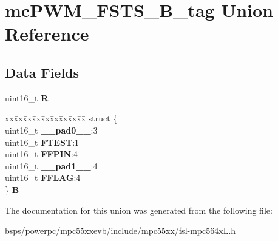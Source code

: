 \hypertarget{unionmcPWM__FSTS__16B__tag}{}\section{mc\+P\+W\+M\+\_\+\+F\+S\+T\+S\+\_\+B\+\_\+tag Union Reference}
\label{unionmcPWM__FSTS__16B__tag}
\subsection*{Data Fields}
\begin{DoxyCompactItemize}
\item 
\mbox{\label{unionmcPWM__FSTS__16B__tag_aafc55c1f2579d0e273c276274f37d31a}} 
uint16\+\_\+t {\bfseries R}
\item 
\mbox{\label{unionmcPWM__FSTS__16B__tag_a7fba2d532d7be63c510093bb674b2115}} 
\begin{tabbing}
xx\=xx\=xx\=xx\=xx\=xx\=xx\=xx\=xx\=\kill
struct \{\\
\>uint16\_t {\bfseries \_\_pad0\_\_}:3\\
\>uint16\_t {\bfseries FTEST}:1\\
\>uint16\_t {\bfseries FFPIN}:4\\
\>uint16\_t {\bfseries \_\_pad1\_\_}:4\\
\>uint16\_t {\bfseries FFLAG}:4\\
\} {\bfseries B}\\

\end{tabbing}\end{DoxyCompactItemize}


The documentation for this union was generated from the following file\+:\begin{DoxyCompactItemize}
\item 
bsps/powerpc/mpc55xxevb/include/mpc55xx/fsl-\/mpc564x\+L.\+h\end{DoxyCompactItemize}
